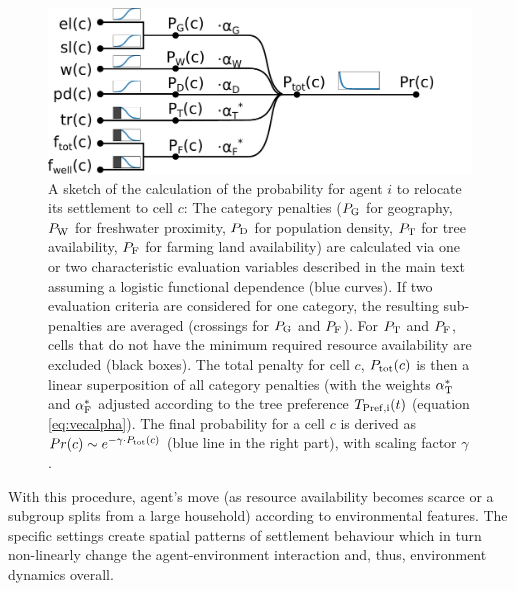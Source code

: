 \begin{figure}
	\centering
	\includegraphics[width=1\textwidth]{images/SketchABM2/sketchMoving}
	\caption{A sketch of the calculation of the probability for agent $i$ to relocate its settlement to cell $c$: The category penalties ($P_{\rm G}$ for geography, $P_{\rm W}$ for freshwater proximity, $P_{\rm D}$ for population density, $P_{\rm T}$ for tree availability, $P_{\rm F}$ for farming land availability) are calculated via one or two characteristic evaluation variables described in the main text assuming a logistic functional dependence (blue curves). 
	If two evaluation criteria are considered for one category, the resulting sub-penalties are averaged (crossings for $P_{\rm G}$ and $P_{\rm F}$).
	For $P_{\rm T}$ and $P_{\rm F}$, cells that do not have the minimum required resource availability are excluded (black boxes).
	The total penalty for cell $c$, $P_{\rm tot}(c)$ is then a linear superposition of all category penalties (with the weights $\alpha_{\rm T}^*$ and $\alpha_{\rm F}^*$ adjusted according to the tree preference $T_{\rm Pref, i}(t)$ (equation \ref{eq:vecalpha}).
	The final probability for a cell $c$ is derived as $Pr(c) \sim e^{-\gamma \cdot P_{\rm tot}(c)}$ (blue line in the right part), with scaling factor $\gamma$.} 
	\label{fig:sketchmoving}
\end{figure}



With this procedure, agent's move (as resource availability becomes scarce or a subgroup splits from a large household) according to environmental features. 
The specific settings create spatial patterns of settlement behaviour which in turn non-linearly change the agent-environment interaction and, thus, environment dynamics overall.

